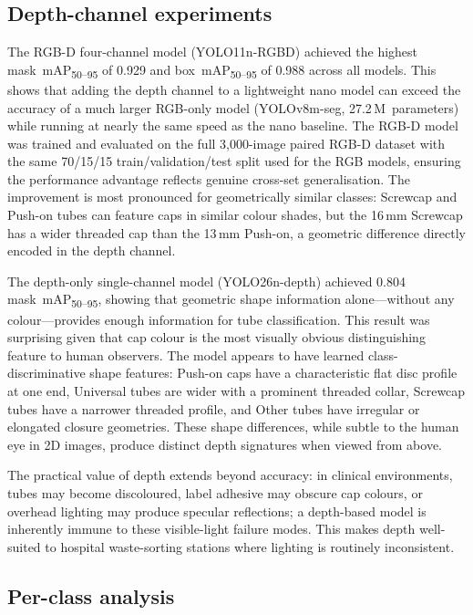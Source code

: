 \documentclass{Academic}
\begin{document}
\subsection{Depth-channel experiments}

The RGB-D four-channel model (YOLO11n-RGBD) achieved the highest mask~mAP\textsubscript{50--95} of 0.929 and box~mAP\textsubscript{50--95} of 0.988 across all models. This shows that adding the depth channel to a lightweight nano model can exceed the accuracy of a much larger RGB-only model (YOLOv8m-seg, 27.2\,M~parameters) while running at nearly the same speed as the nano baseline. The RGB-D model was trained and evaluated on the full 3,000-image paired RGB-D dataset with the same 70/15/15 train/validation/test split used for the RGB models, ensuring the performance advantage reflects genuine cross-set generalisation. The improvement is most pronounced for geometrically similar classes: Screwcap and Push-on tubes can feature caps in similar colour shades, but the 16\,mm Screwcap has a wider threaded cap than the 13\,mm Push-on, a geometric difference directly encoded in the depth channel.

The depth-only single-channel model (YOLO26n-depth) achieved 0.804 mask~mAP\textsubscript{50--95}, showing that geometric shape information alone---without any colour---provides enough information for tube classification. This result was surprising given that cap colour is the most visually obvious distinguishing feature to human observers. The model appears to have learned class-discriminative shape features: Push-on caps have a characteristic flat disc profile at one end, Universal tubes are wider with a prominent threaded collar, Screwcap tubes have a narrower threaded profile, and Other tubes have irregular or elongated closure geometries. These shape differences, while subtle to the human eye in 2D images, produce distinct depth signatures when viewed from above.

The practical value of depth extends beyond accuracy: in clinical environments, tubes may become discoloured, label adhesive may obscure cap colours, or overhead lighting may produce specular reflections; a depth-based model is inherently immune to these visible-light failure modes. This makes depth well-suited to hospital waste-sorting stations where lighting is routinely inconsistent.

\subsection{Per-class analysis}
\end{document}
